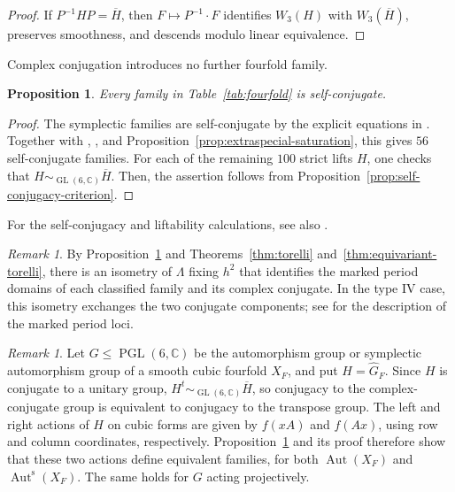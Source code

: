\documentclass[12pt]{amsart}
\numberwithin{equation}{section}
\theoremstyle{plain}
\newtheorem{prop}[thm]{Proposition}
\theoremstyle{definition}
\theoremstyle{remark}
\newtheorem{rmk}[thm]{Remark}
\newcommand{\CC}{\mathbb C}
\DeclareMathOperator{\Aut}{Aut}
\DeclareMathOperator{\GL}{GL}
\DeclareMathOperator{\PGL}{PGL}
\newcommand{\Auts}{\Aut^{\mathrm s}}
\begin{document}
\begin{proof}
If $P^{-1}HP=\overline H$, then $F\mapsto P^{-1}\cdot F$ identifies
$W_3(H)$ with $W_3(\overline H)$, preserves smoothness, and descends modulo
linear equivalence.
\end{proof}

Complex conjugation introduces no further fourfold family.

\begin{prop}\label{prop:all-families-self-conjugate}
Every family in Table~\ref{tab:fourfold} is self-conjugate.
\end{prop}

\begin{proof}
The symplectic families are self-conjugate by the explicit equations in
\cite{KOIKE202512,KOIKE2026}. Together with \cite[\S4]{he2025cubicfourfoldsorder7automorphism}, \cite[\S6]{FWZ26},
 and Proposition~\ref{prop:extraspecial-saturation},
this gives $56$ self-conjugate families. For each of the remaining $100$
strict lifts $H$, one checks that $H\sim_{\GL(6,\CC)}\overline H$.
Then, the assertion follows from Proposition~\ref{prop:self-conjugacy-criterion}.
\end{proof}

For the self-conjugacy and liftability calculations, see also
.

\begin{rmk}\label{rmk:conjugate-components}
By Proposition~\ref{prop:all-families-self-conjugate} and
Theorems~\ref{thm:torelli} and~\ref{thm:equivariant-torelli}, there is an isometry
of $\Lambda$ fixing $h^2$ that identifies the marked period domains of each
classified family and its complex conjugate.  In the type IV case,
this isometry exchanges the two conjugate components; see
\cite[Proposition~4.8]{yu2020moduli} for the description of the marked
period loci.
\end{rmk}

\begin{rmk}\label{rmk:transpose-conjugate}
Let $G\leq\PGL(6,\CC)$ be the automorphism group or symplectic
automorphism group of a smooth cubic fourfold $X_F$, and put $H=\widehat G_F$.
Since $H$ is conjugate to a unitary group,
$H^t\sim_{\GL(6,\CC)}\overline H$, so conjugacy to the complex-conjugate
group is equivalent to conjugacy to the transpose group.
The left and right actions of $H$ on cubic forms are given by $f(xA)$
and $f(Ax)$, using row and column coordinates, respectively.
Proposition~\ref{prop:all-families-self-conjugate} and its proof therefore
show that these two actions define equivalent families, for both
$\Aut(X_F)$ and $\Auts(X_F)$. The same holds for $G$ acting
projectively.
\end{rmk}
\end{document}
